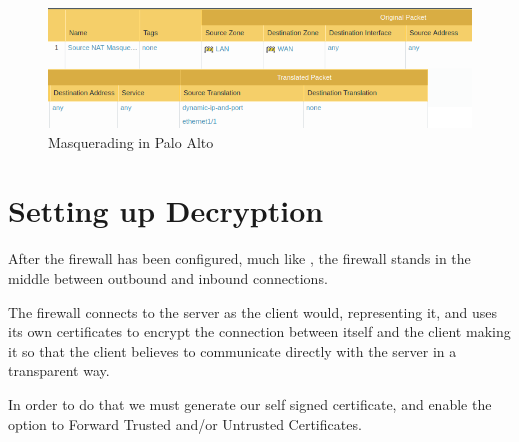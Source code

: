 \begin{figure}[!hb]
 \centering
 \includegraphics[width=13cm]{img/NAT_Masquerade.png}
 \caption{ Masquerading in Palo Alto }
 \label{NAT Masquerade}
\end{figure}


\newpage

\section{Setting up Decryption}

After the firewall has been configured, much like , the firewall stands in the middle between outbound and inbound connections.

The firewall connects to the server as the client would, representing it, and uses its own certificates to encrypt the connection between itself and the client making it so that the client believes to communicate directly with the server in a transparent way.

In order to do that we must generate our self signed certificate, and enable the option to Forward Trusted and/or Untrusted Certificates.

